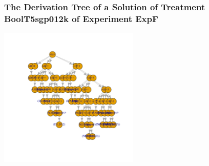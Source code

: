  \begin{frame}
 \frametitle{ The Derivation Tree of a Solution of Treatment BoolT5sgp012k of Experiment ExpF }
 \begin{center}
\includegraphics[width=0.5\textwidth, angle=0]
{ExpFDerivationTreeFigure010.pdf}
 \end{center}
 \label{templateReport/ExpFDerivationTreeFigure010.pdf}  
 \end{frame}

